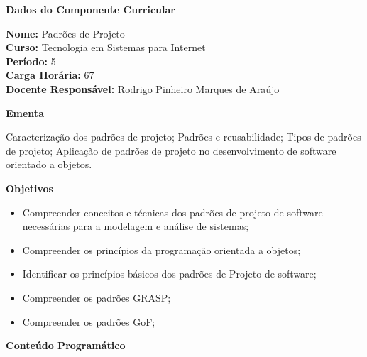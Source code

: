 

\begin{snugshade}\begin{center}\textbf{
	Dados do Componente Curricular
}\end{center}\end{snugshade}

\noindent 	\textbf{Nome:} Padrões de Projeto
\\ 			\textbf{Curso:} Tecnologia em Sistemas para Internet
\\ 			\textbf{Período:} \unit{5}{\degree}
\\ 			\textbf{Carga Horária:} \unit{67}{\hour}
\\ 			\textbf{Docente Responsável:} Rodrigo Pinheiro Marques de Araújo


\begin{snugshade}\begin{center}\textbf{
    Ementa
\vphantom{q}}\end{center}\end{snugshade}

\noindent
Caracterização dos padrões de projeto; Padrões e reusabilidade; Tipos de padrões de projeto; Aplicação de padrões de projeto no desenvolvimento de software orientado a objetos.


\begin{snugshade}\begin{center}\textbf{
    Objetivos
}\end{center}\end{snugshade}


\begin{itemize}

\item Compreender conceitos e técnicas dos padrões de projeto de software necessárias para a modelagem e análise de sistemas;
\item Compreender os princípios da programação orientada a objetos;
\item Identificar os princípios básicos dos padrões de Projeto de software;
\item Compreender os padrões GRASP;
\item Compreender os padrões GoF;

\end{itemize}


\begin{snugshade}\begin{center}\textbf{
    Conteúdo Programático
}\end{center}\end{snugshade}


